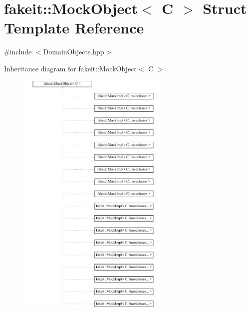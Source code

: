 \hypertarget{structfakeit_1_1MockObject}{}\section{fakeit\+::Mock\+Object$<$ C $>$ Struct Template Reference}
\label{structfakeit_1_1MockObject}


{\ttfamily \#include $<$Domain\+Objects.\+hpp$>$}

Inheritance diagram for fakeit\+::Mock\+Object$<$ C $>$\+:\begin{figure}[H]
\begin{center}
\leavevmode
\includegraphics[height=12.000000cm]{structfakeit_1_1MockObject}
\end{center}
\end{figure}
